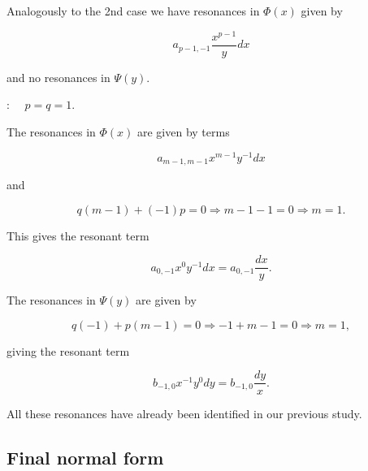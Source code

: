 \documentclass[11pt,a4paper]{amsart}
\theoremstyle{definition}
\begin{document}
Analogously to the 2nd case we have resonances in $\Phi(x)$ given by

\[
a_{p-1,-1}\frac{x^{p-1}}{y}dx
\]

and no resonances in $\Psi(y)$.


 : $\quad p=q=1.$

The resonances in $\Phi(x)$ are given by terms

\[
a_{m-1,m-1}x^{m-1}y^{-1}dx
\]

and

\[
q(m-1)+(-1)p=0
\Rightarrow m-1-1=0
\Rightarrow m=1.
\]

This gives the resonant term

\[
a_{0,-1}x^{0}y^{-1}dx
=
a_{0,-1}\frac{dx}{y}.
\]


The resonances in $\Psi(y)$ are given by

\[
q(-1)+p(m-1)=0
\Rightarrow -1+m-1=0
\Rightarrow m=1,
\]

giving the resonant term

\[
b_{-1,0}x^{-1}y^{0}dy
=
b_{-1,0}\frac{dy}{x}.
\]



All these resonances have already been identified in our previous study. 


\subsection{Final normal form}
\end{document}
